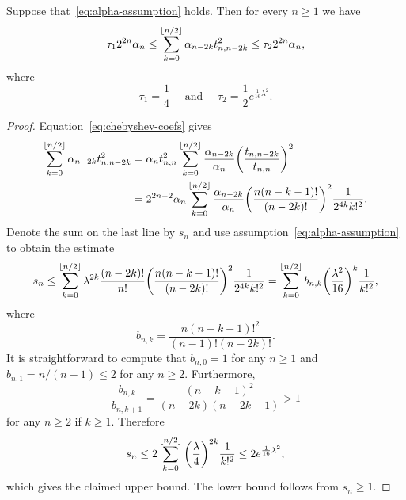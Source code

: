 \documentclass{mcom-l}
\numberwithin{equation}{section}
\numberwithin{theorem}{section} %
\DeclarePairedDelimiter{\floor}{\lfloor}{\rfloor}         %
\begin{document}
\begin{lemma} \label{lemma:chebyshev-c-lemma}
  Suppose that~\eqref{eq:alpha-assumption} holds.
  Then for every $n \geq 1$ we have
  \begin{equation} \label{eq:chebyshev-norm-lemma}
    \tau_1 2^{2n} \alpha_n \leq \sum_{k=0}^{\floor{n/2}} \alpha_{n - 2k} t_{n, n - 2k}^2 \leq \tau_2 2^{2n} \alpha_n, 
  \end{equation}
  where
  \begin{equation} \label{eq:chebyshev-norm-lemma-constants}
    \tau_1 = \frac{1}{4} \quad \text{ and } \quad \tau_2 = \frac{1}{2} e^{\frac{1}{16} \lambda^2 }.
  \end{equation}
\end{lemma}
\begin{proof}
  Equation~\eqref{eq:chebyshev-coefs} gives
  \begin{equation*}
    \begin{split}
      \sum_{k=0}^{\floor{n/2}} \alpha_{n - 2k} t_{n, n - 2k}^2 &= \alpha_n t_{n,n}^2 \sum_{k=0}^{\floor{n/2}} \frac{\alpha_{n-2k}}{\alpha_n} \bigg( \frac{t_{n, n - 2k}}{t_{n,n}} \bigg)^2 \\
      &= 2^{2n-2} \alpha_n \sum_{k=0}^{\floor{n/2}} \frac{\alpha_{n-2k}}{\alpha_n} \bigg(\frac{n (n-k-1)!}{(n-2k)!}\bigg)^2 \frac{1}{2^{4k} k!^2}.
      \end{split}
  \end{equation*}
  Denote the sum on the last line by $s_n$ and use assumption~\eqref{eq:alpha-assumption} to obtain the estimate
  \begin{equation*}
      s_n \leq \sum_{k=0}^{\floor{n/2}} \lambda^{2k} \frac{(n-2k)!}{n!}  \bigg(\frac{n (n-k-1)!}{(n-2k)!}\bigg)^2 \frac{1}{2^{4k} k!^2} = \sum_{k=0}^{\floor{n/2}} b_{n,k} \bigg( \frac{\lambda^2}{16} \bigg)^{k} \frac{1}{k!^2},
\end{equation*}
where
\begin{equation*}
  b_{n, k} = \frac{n (n-k-1)!^2}{(n-1)!(n-2k)!}.
\end{equation*}
It is straightforward to compute that $b_{n, 0} = 1$ for any $n \geq 1$ and $b_{n, 1} = n/(n-1) \leq 2$ for any $n \geq 2$.
Furthermore,
\begin{equation*}
  \frac{b_{n,k}}{b_{n,k+1}} = \frac{(n-k-1)^2}{(n-2k)(n-2k-1)} > 1
\end{equation*}
for any $n \geq 2$ if $k \geq 1$.
Therefore
\begin{equation*}
  s_n \leq 2 \sum_{k=0}^{\floor{n/2}} \bigg( \frac{\lambda}{4} \bigg)^{2k} \frac{1}{k!^2} \leq 2 e^{\frac{1}{16} \lambda^2 },
\end{equation*}
which gives the claimed upper bound.
The lower bound follows from $s_n \geq 1$.
\end{proof}
\end{document}
